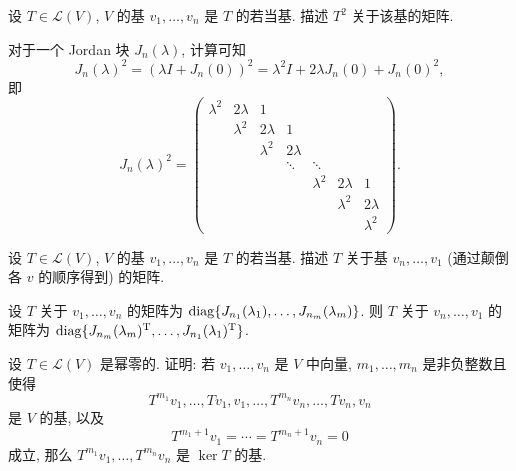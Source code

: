 \documentclass{article}
\begin{document}
\begin{problem}[8C-8]
设 $T \in \mathcal{L}(V)$, $V$ 的基 $v_1, \ldots, v_n$ 是 $T$ 的若当基. 描述 $T^2$ 关于该基的矩阵.
\end{problem}

\begin{solution}
  对于一个 Jordan 块 \( J_n(\lambda) \), 计算可知
  \[ J_n(\lambda)^2 = (\lambda I + J_n(0))^2 = \lambda^2 I + 2\lambda J_n(0) + J_n(0)^2, \]
  即
  \[ J_n(\lambda)^2 =
  \begin{pmatrix}
    \lambda^2 & 2\lambda  & 1 \\
              & \lambda^2 & 2\lambda  & 1 \\
              &           & \lambda^2 & 2\lambda \\
              &           &           & \ddots   & \ddots  \\
              &           &           &          & \lambda^2 & 2\lambda & 1 \\
              &           &           &          &         & \lambda^2 & 2\lambda \\
              &           &           &          &         &           & \lambda^2
  \end{pmatrix}.
  \]
\end{solution}



\begin{problem}[8C-10]
设 $T \in \mathcal{L}(V)$, $V$ 的基 $v_1, \ldots, v_n$ 是 $T$ 的若当基. 描述 $T$ 关于基 $v_n, \ldots, v_1$ (通过颠倒各 $v$ 的顺序得到) 的矩阵.
\end{problem}

\begin{solution}
  设 \( T \) 关于 \( v_1, \ldots, v_n \) 的矩阵为 \( \operatorname{diag}\{J_{n_1}(\lambda_1),\dots,J_{n_m}(\lambda_m)\} \). 则 \( T \) 关于 \( v_n, \ldots, v_1 \) 的矩阵为 \( \operatorname{diag}\{J_{n_m}(\lambda_m)^\mathrm{T}, \dots, J_{n_1}(\lambda_1)^\mathrm{T}\} \). 
\end{solution}



\begin{problem}[8C-13]
设 $T \in \mathcal{L}(V)$ 是幂零的. 证明: 若 $v_1, \ldots, v_n$ 是 $V$ 中向量, $m_1, \ldots, m_n$ 是非负整数且使得
\[
T^{m_1} v_1, \ldots, T v_1, v_1, \ldots, T^{m_n} v_n, \ldots, T v_n, v_n
\]
是 $V$ 的基, 以及
\[
T^{m_1+1} v_1 = \cdots = T^{m_n+1} v_n = 0
\]
成立, 那么 $T^{m_1} v_1, \ldots, T^{m_n} v_n$ 是 $\ker T$ 的基.
\end{problem}
\end{document}
